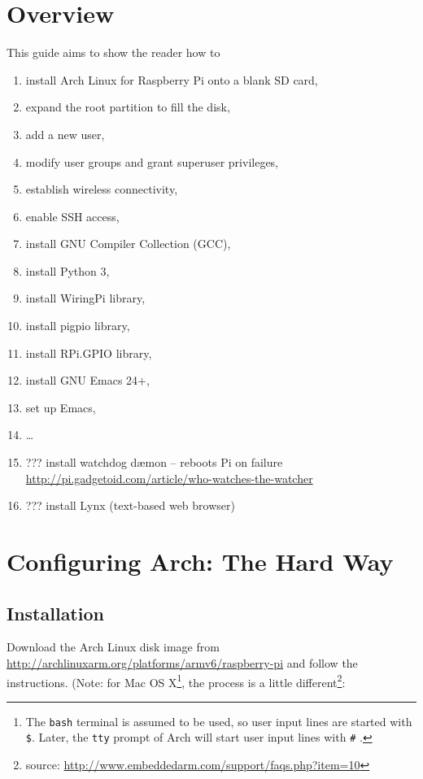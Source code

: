 \documentclass[12pt,letterpaper]{article}
\begin{document}
\section{Overview}
This guide aims to show the reader how to
\begin{enumerate}
\item install Arch Linux for Raspberry Pi onto a blank SD card,
\item expand the root partition to fill the disk,
\item add a new user,
\item modify user groups and grant superuser privileges,
\item establish wireless connectivity,
\item enable SSH access,
\item install GNU Compiler Collection (GCC), %
\item install Python 3,
\item install WiringPi library,
\item install pigpio library,
\item install RPi.GPIO library,
\item install GNU Emacs 24+,
\item set up Emacs,
\item \ldots
\item ??? install watchdog d\ae mon -- reboots Pi on failure \url{http://pi.gadgetoid.com/article/who-watches-the-watcher}
\item ??? install Lynx (text-based web browser)
\end{enumerate}

\section{Configuring Arch: The Hard Way}

\subsection{Installation}
Download the Arch Linux disk image from \url{http://archlinuxarm.org/platforms/armv6/raspberry-pi} and follow the instructions.
(Note: for Mac OS X\footnote{The \lstinline{bash} terminal is assumed to be used, so user input lines are started with \lstinline{$}.  Later, the \lstinline{tty} prompt of Arch will start user input lines with \lstinline{#}%
.}, the process is a little different\footnote{source: \url{http://www.embeddedarm.com/support/faqs.php?item=10}}:
\end{document}

